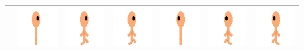 \documentclass[../Main.tex]{subfiles}
\begin{document}
\begin{center}
\begin{tabular}{ | m{} | m{} m{} m{} m{} m{} m{} | }
                    & \centerline{\includegraphics[scale=3]{../res/textures/entities/followers/fire/East.png}} & \centerline{\includegraphics[scale=3]{../res/textures/entities/followers/fire/East-Walk-1.png}} & \centerline{\includegraphics[scale=3]{../res/textures/entities/followers/fire/East-Walk-2.png}} & \centerline{\includegraphics[scale=3]{../res/textures/entities/followers/fire/West.png}} & \centerline{\includegraphics[scale=3]{../res/textures/entities/followers/fire/West-Walk-1.png}} & \centerline{\includegraphics[scale=3]{../res/textures/entities/followers/fire/West-Walk-2.png}} \\
                    \hline

\end{tabular}
\end{center}
\end{document}
